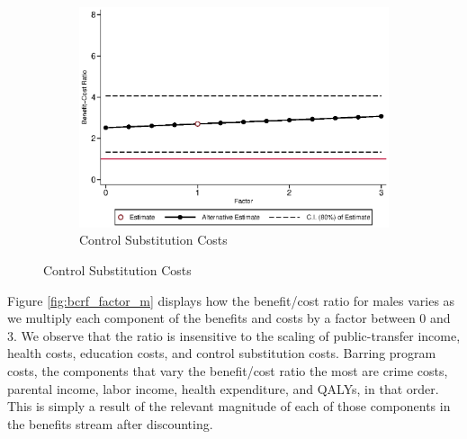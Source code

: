\begin{figure}[H]
\ContinuedFloat		
	\begin{subfigure}[h]{0.8\textwidth}
	\centering
	\caption{Control Substitution Costs} \label{fig:bcrf_cc_f1}
	\includegraphics[width=\textwidth]{AppOutput/Sensitivity/bcrf_cc_f1.eps}
	\end{subfigure}
	
\end{figure}

\noindent Figure \ref{fig:bcrf_factor_m} displays how the benefit/cost ratio for males varies
as we multiply each component of the benefits and costs by a factor between 0 and 3.
We observe that the ratio is insensitive to the scaling of public-transfer income, health costs,
education costs, and control substitution costs. Barring program costs, the components that
vary the benefit/cost ratio the most are crime costs, parental income, labor income,
health expenditure, and QALYs, in that order. This is simply a result of the relevant 
magnitude of each of those components in the benefits stream after discounting. 


